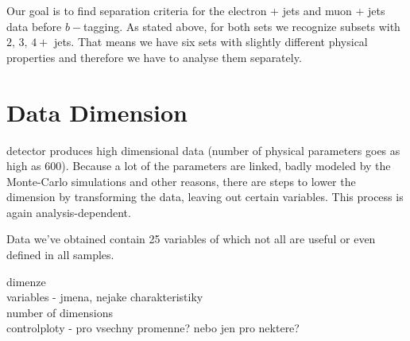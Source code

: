 Our goal is to find separation criteria for the electron + jets and muon + jets data before $b-$tagging. As stated above, for both sets we recognize subsets with $2, \,3,\, 4+$ jets. That means we have six sets with slightly different physical properties and therefore we have to analyse them separately. 

\section{Data Dimension}
\dzero detector  produces high dimensional data (number of physical parameters  goes as high as $600$). Because a lot of the parameters are linked, badly modeled by the Monte-Carlo simulations and other reasons, there are steps to lower the dimension by transforming the data, leaving out certain variables. This process is again analysis-dependent.

Data we've obtained contain 25 variables of which not all are useful or even defined in all samples. 


dimenze \\
variables - jmena, nejake charakteristiky \\
number of dimensions \\
controlploty - pro vsechny promenne? nebo jen pro nektere?\\

